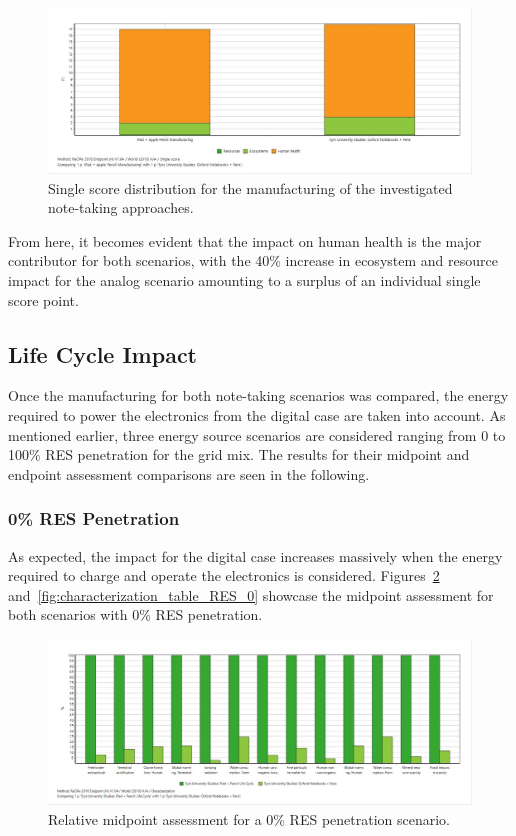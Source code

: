 \begin{figure}[H]
    \centering
    \includegraphics[width=\textwidth]{images/Manufacturing/Single_Score_Manufacturing.JPG}
    \caption{Single score distribution for the manufacturing of the investigated note-taking approaches.}\label{fig:single_score_manufacturing}
\end{figure}

From here, it becomes evident that the impact on human health is the major contributor for both scenarios, with the 40\% increase in ecosystem and resource impact for the analog scenario amounting to a surplus of an individual single score point. 

\subsection{Life Cycle Impact}\label{subsec:results_life_cycle}
Once the manufacturing for both note-taking scenarios was compared, the energy required to power the electronics from the digital case are taken into account. As mentioned earlier, three energy source scenarios are considered ranging from 0 to 100\% RES penetration for the grid mix. The results for their midpoint and endpoint assessment comparisons are seen in the following.

\subsubsection{0\% RES Penetration}\label{subsubsec:0RES}
As expected, the impact for the digital case increases massively when the energy required to charge and operate the electronics is considered. Figures~\ref{fig:characterization_RES_0} and~\ref{fig:characterization_table_RES_0} showcase the midpoint assessment for both scenarios with 0\% RES penetration.

\begin{figure}[H]
    \centering
    \includegraphics[width=\textwidth]{images/RES_0/Characterization_RES_0.JPG}
    \caption{Relative midpoint assessment for a 0\% RES penetration scenario.}\label{fig:characterization_RES_0}
\end{figure}

